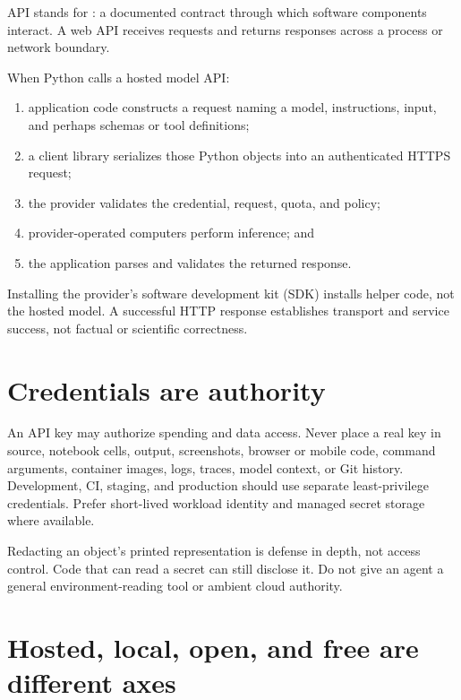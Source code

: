 API stands for : a documented contract
through which software components interact. A web API receives requests and
returns responses across a process or network boundary.

When Python calls a hosted model API:

\begin{enumerate}
  \item application code constructs a request naming a model, instructions,
  input, and perhaps schemas or tool definitions;
  \item a client library serializes those Python objects into an authenticated
  HTTPS request;
  \item the provider validates the credential, request, quota, and policy;
  \item provider-operated computers perform inference; and
  \item the application parses and validates the returned response.
\end{enumerate}

Installing the provider's software development kit (SDK) installs helper code,
not the hosted model. A successful HTTP response establishes transport and
service success, not factual or scientific correctness.

\section{Credentials are authority}

An API key may authorize spending and data access. Never place a real key in
source, notebook cells, output, screenshots, browser or mobile code, command
arguments, container images, logs, traces, model context, or Git history.
Development, CI, staging, and production should use separate least-privilege
credentials. Prefer short-lived workload identity and managed secret storage
where available.

\begin{warningbox}
Redacting an object's printed representation is defense in depth, not access
control. Code that can read a secret can still disclose it. Do not give an agent
a general environment-reading tool or ambient cloud authority.
\end{warningbox}

\section{Hosted, local, open, and free are different axes}

